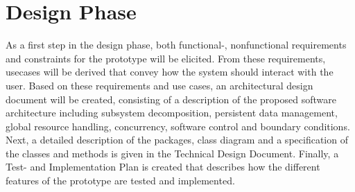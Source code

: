 \section{Design Phase}
As a first step in the design phase, both functional-, nonfunctional requirements and constraints for the prototype will be elicited. From these requirements, usecases will be derived that convey how the system should interact with the user. Based on these requirements and use cases, an architectural design document will be created, consisting of a description of the proposed software architecture including subsystem decomposition, persistent data management, global resource handling, concurrency, software control and boundary conditions. Next, a detailed description of the packages, class diagram and a specification of the classes and methods is given in the Technical Design Document. Finally, a Test- and Implementation Plan is created that describes how the different features of the prototype are tested and implemented.



